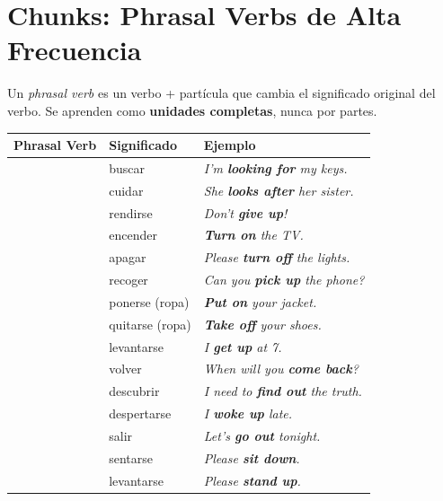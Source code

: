 \documentclass[12pt,a4paper]{article}
\begin{document}
\section{Chunks: Phrasal Verbs de Alta Frecuencia}

\begin{cajachunk}
Un \textit{phrasal verb} es un verbo + partícula que cambia el significado original del verbo. Se aprenden como \textbf{unidades completas}, nunca por partes.

\medskip
\begin{tabularx}{\textwidth}{@{} l l X @{}}
\toprule
\textbf{Phrasal Verb} & \textbf{Significado} & \textbf{Ejemplo} \\
\midrule
\eng{look for} & buscar & \textit{I'm \textbf{looking for} my keys.} \\
\eng{look after} & cuidar & \textit{She \textbf{looks after} her sister.} \\
\eng{give up} & rendirse & \textit{Don't \textbf{give up}!} \\
\eng{turn on} & encender & \textit{\textbf{Turn on} the TV.} \\
\eng{turn off} & apagar & \textit{Please \textbf{turn off} the lights.} \\
\eng{pick up} & recoger & \textit{Can you \textbf{pick up} the phone?} \\
\eng{put on} & ponerse (ropa) & \textit{\textbf{Put on} your jacket.} \\
\eng{take off} & quitarse (ropa) & \textit{\textbf{Take off} your shoes.} \\
\eng{get up} & levantarse & \textit{I \textbf{get up} at 7.} \\
\eng{come back} & volver & \textit{When will you \textbf{come back}?} \\
\eng{find out} & descubrir & \textit{I need to \textbf{find out} the truth.} \\
\eng{wake up} & despertarse & \textit{I \textbf{woke up} late.} \\
\eng{go out} & salir & \textit{Let's \textbf{go out} tonight.} \\
\eng{sit down} & sentarse & \textit{Please \textbf{sit down}.} \\
\eng{stand up} & levantarse & \textit{Please \textbf{stand up}.} \\
\bottomrule
\end{tabularx}
\end{cajachunk}
\end{document}
